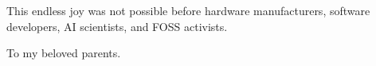 \begin{flushleft}
	\thispagestyle{empty}
	\vspace*{\fill}
	This endless joy was not possible before hardware manufacturers, software developers, AI scientists, and FOSS activists.
	\vspace*{\fill}
\end{flushleft}
\clearpage
\begin{center}
	\vspace*{\fill}
	To my beloved parents.
	\vspace*{\fill}
\end{center}